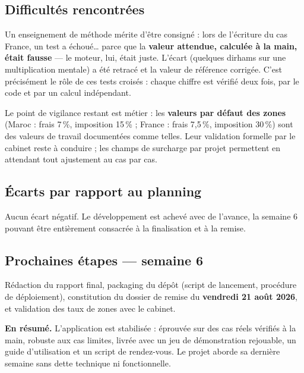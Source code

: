 \documentclass[11pt,a4paper]{article}
\begin{document}

\subsection{Difficultés rencontrées}
Un enseignement de méthode mérite d'être consigné : lors de l'écriture du cas France, un test a échoué… parce que la \textbf{valeur attendue, calculée à la main, était fausse} — le moteur, lui, était juste. L'écart (quelques dirhams sur une multiplication mentale) a été retracé et la valeur de référence corrigée. C'est précisément le rôle de ces tests croisés : chaque chiffre est vérifié deux fois, par le code et par un calcul indépendant.

Le point de vigilance restant est métier : les \textbf{valeurs par défaut des zones} (Maroc : frais 7\,\%, imposition 15\,\% ; France : frais 7,5\,\%, imposition 30\,\%) sont des valeurs de travail documentées comme telles. Leur validation formelle par le cabinet reste à conduire ; les champs de surcharge par projet permettent en attendant tout ajustement au cas par cas.

\subsection{Écarts par rapport au planning}
Aucun écart négatif. Le développement est achevé avec de l'avance, la semaine 6 pouvant être entièrement consacrée à la finalisation et à la remise.

\subsection{Prochaines étapes --- semaine 6}
Rédaction du rapport final, packaging du dépôt (script de lancement, procédure de déploiement), constitution du dossier de remise du \textbf{vendredi 21 août 2026}, et validation des taux de zones avec le cabinet.

\vspace{0.6cm}
\begin{tcolorbox}[colback=eccblue!5,colframe=eccblue!60,boxrule=0.6pt,arc=2pt,
	left=8pt,right=8pt,top=6pt,bottom=6pt]
	\small
	\textbf{\color{eccblue}En résumé.} L'application est stabilisée : éprouvée sur des cas réels vérifiés à la main, robuste aux cas limites, livrée avec un jeu de démonstration rejouable, un guide d'utilisation et un script de rendez-vous. Le projet aborde sa dernière semaine sans dette technique ni fonctionnelle.
\end{tcolorbox}
\end{document}
